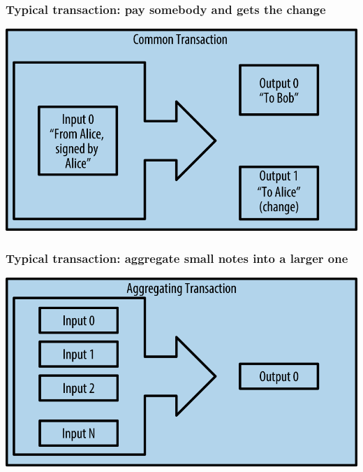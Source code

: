 \documentclass[11pt]{beamer}  %
\begin{document}
\begin{frame}\frametitle{Typical transaction: pay somebody and gets the change}

  \begin{center}
    \includegraphics[scale=1.2,clip=false]{pictures/mbc2_0205.png}
  \end{center}

\end{frame}

\begin{frame}\frametitle{Typical transaction: aggregate small notes into a larger one}

  \begin{center}
    \includegraphics[scale=1.2,clip=false]{pictures/mbc2_0206.png}
  \end{center}

\end{frame}
\end{document}
